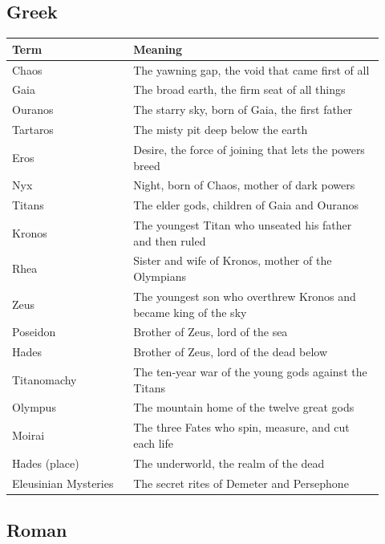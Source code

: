 
\subsection{Greek}

\begin{longtable}{L{0.30\linewidth} L{0.62\linewidth}}
\toprule
\textbf{Term} & \textbf{Meaning} \\
\midrule
\endhead
Chaos & The yawning gap, the void that came first of all \\
Gaia & The broad earth, the firm seat of all things \\
Ouranos & The starry sky, born of Gaia, the first father \\
Tartaros & The misty pit deep below the earth \\
Eros & Desire, the force of joining that lets the powers breed \\
Nyx & Night, born of Chaos, mother of dark powers \\
Titans & The elder gods, children of Gaia and Ouranos \\
Kronos & The youngest Titan who unseated his father and then ruled \\
Rhea & Sister and wife of Kronos, mother of the Olympians \\
Zeus & The youngest son who overthrew Kronos and became king of the sky \\
Poseidon & Brother of Zeus, lord of the sea \\
Hades & Brother of Zeus, lord of the dead below \\
Titanomachy & The ten-year war of the young gods against the Titans \\
Olympus & The mountain home of the twelve great gods \\
Moirai & The three Fates who spin, measure, and cut each life \\
Hades (place) & The underworld, the realm of the dead \\
Eleusinian Mysteries & The secret rites of Demeter and Persephone \\
\bottomrule
\end{longtable}

\subsection{Roman}

